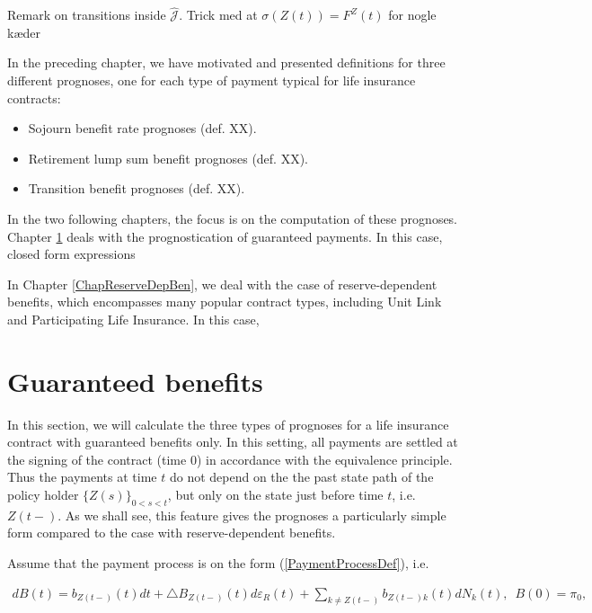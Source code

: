 \documentclass{book}
\newcommand{\1}[1]{\mathbbm{1}_{\left\lbrace #1 \right\rbrace}}
\theoremstyle{break}
\theoremstyle{remark}
\newenvironment{remark}
  {\pushQED{\qed}\renewcommand{\qedsymbol}{\scalebox{1.4}{$\circ$}}\remarkx}
  {\popQED\endremarkx}
\numberwithin{equation}{section}
\begin{document}
\begin{remark}
Remark on transitions inside $\hat{\mathcal{J}}$. Trick med at $\sigma(Z(t))=F^Z(t)$ for nogle kæder
\end{remark}

In the preceding chapter, we have motivated and presented definitions for three different prognoses, one for each type of payment typical for life insurance contracts:

\begin{itemize}
	\item Sojourn benefit rate prognoses (def. XX).
	\item Retirement lump sum benefit prognoses (def. XX).
	\item Transition benefit prognoses (def. XX).
\end{itemize}

In the two following chapters, the focus is on the computation of these prognoses. Chapter \ref{ChapGuaranteedBen} deals with the prognostication of guaranteed payments. In this case, closed form expressions

In Chapter \ref{ChapReserveDepBen}, we deal with the case of reserve-dependent benefits, which encompasses many popular contract types, including Unit Link and Participating Life Insurance. In this case, 

\chapter{Guaranteed benefits} \label{ChapGuaranteedBen}

In this section, we will calculate the three types of prognoses for a life insurance contract with guaranteed benefits only. In this setting, all payments are settled at the signing of the contract (time 0) in accordance with the equivalence principle. Thus the payments at time $t$ do not depend on the the past state path of the policy holder $\{ Z(s) \}_{0 < s < t}$, but only on the state just before time $t$, i.e. $Z(t-)$. As we shall see, this feature gives the prognoses a particularly simple form compared to the case with reserve-dependent benefits.

Assume that the payment process is on the form (\ref{PaymentProcessDef}), i.e.

\begin{align*}
    dB(t) = b_{Z(t-)}(t)dt + \triangle B_{Z(t-)}(t) d \varepsilon_{R}(t) + \sum_{k \neq Z(t-)}b_{{Z(t-)}k}(t)dN_{k}(t), \, \, \, B(0) = \pi_0,
\end{align*}
\end{document}
